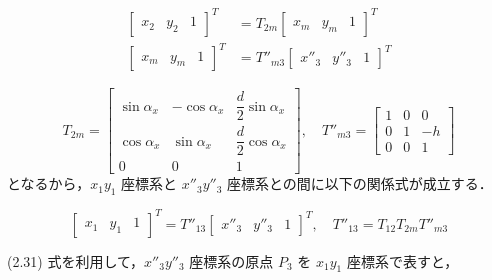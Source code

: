     \begin{align}
        \begin{bmatrix}
        x_2 & y_2 & 1
        \end{bmatrix}^T
        &= T_{2m}
        \begin{bmatrix}
        x_m & y_m & 1
        \end{bmatrix}^T
        \tag{2.29}
        \\
        \begin{bmatrix}
        x_m & y_m & 1
        \end{bmatrix}^T
        &= T''_{m3}
        \begin{bmatrix}
        x''_3 & y''_3 & 1
        \end{bmatrix}^T
        \tag{2.30}
        \end{align}
        
        \[
        T_{2m} =
        \begin{bmatrix}
        \sin\alpha_x & -\cos\alpha_x & \dfrac{d}{2}\sin\alpha_x \\
        \cos\alpha_x & \sin\alpha_x & \dfrac{d}{2}\cos\alpha_x \\
        0 & 0 & 1
        \end{bmatrix}
        ,\quad
        T''_{m3} =
        \begin{bmatrix}
        1 & 0 & 0 \\
        0 & 1 & -h \\
        0 & 0 & 1
        \end{bmatrix}
        \]
        となるから，$x_1 y_1$ 座標系と $x''_3 y''_3$ 座標系との間に以下の関係式が成立する．

        \[
        \begin{bmatrix}
        x_1 & y_1 & 1
        \end{bmatrix}^T
        =
        T''_{13}
        \begin{bmatrix}
        x''_3 & y''_3 & 1
        \end{bmatrix}^T
        ,\quad
        T''_{13} = T_{12} T_{2m} T''_{m3}
        \tag{2.31}
        \]
        
        (2.31) 式を利用して，$x''_3 y''_3$ 座標系の原点 $P_3$ を $x_1 y_1$ 座標系で表すと，
        
